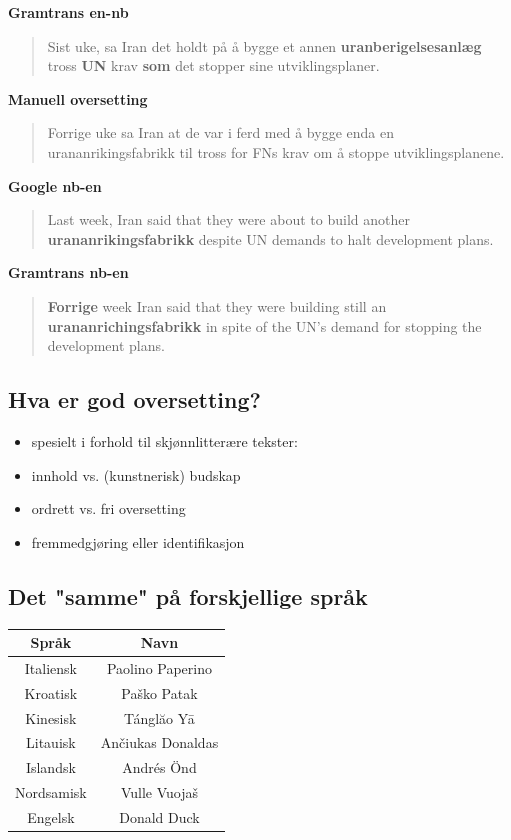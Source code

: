 \documentclass[a4paper,english,12pt]{article}
\begin{document}
\begin{spacing}{1.0}
\textbf{Gramtrans en-nb}
\begin{quote}
Sist uke, sa Iran det holdt på å bygge et annen \textbf{uranberigelsesanlæg} tross \textbf{UN} krav \textbf{som} det stopper sine utviklingsplaner.
\end{quote}

\textbf{Manuell oversetting}
\begin{quote}
Forrige uke sa Iran at de var i ferd med å bygge enda en urananrikingsfabrikk til tross for FNs krav om å stoppe utviklingsplanene.
\end{quote}


\textbf{Google nb-en} 
\begin{quote}
Last week, Iran said that they were about to build another \textbf{urananrikingsfabrikk} despite UN demands to halt development plans.
\end{quote}

\textbf{Gramtrans nb-en}
\begin{quote}
\textbf{Forrige} week Iran said that they were building still an \textbf{urananrichingsfabrikk} in spite of the UN's demand for stopping the development plans.
\end{quote}

 

\subsection{Hva er god oversetting?} 
\begin{itemize}
\item spesielt i forhold til skjønnlitterære tekster:
\item innhold vs. (kunstnerisk) budskap
\item ordrett vs. fri oversetting 
\item fremmedgjøring eller identifikasjon 
\end{itemize} 
 

\subsection{Det "samme" på forskjellige språk}
\begin{tabular}{|c|c|}
\hline
\textbf{Språk} & \textbf{Navn} \\
\hline
Italiensk &  Paolino Paperino  \\
\hline
Kroatisk &  Paško Patak  \\
\hline
Kinesisk & Tánglăo Yā \\
\hline
Litauisk & Ančiukas Donaldas \\
\hline
Islandsk & Andrés Önd \\
\hline
Nordsamisk & Vulle Vuojaš \\
\hline
Engelsk & Donald Duck \\
\hline
\end{tabular}
 


\end{spacing}
\end{document}
